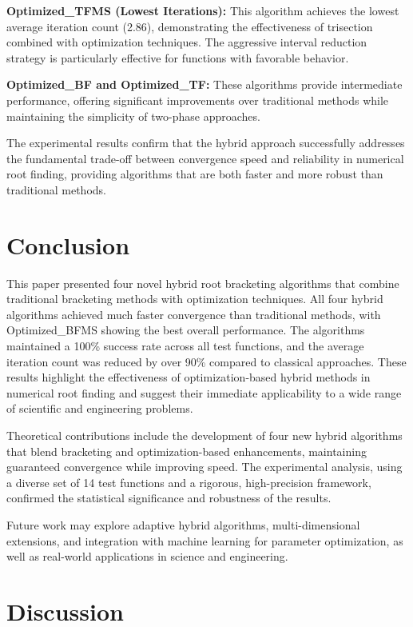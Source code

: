 \documentclass[amsmath, amssymb, aps]{revtex4-2}
\begin{document}
\textbf{Optimized\_TFMS (Lowest Iterations):} This algorithm achieves the lowest average iteration count (2.86), demonstrating the effectiveness of trisection combined with optimization techniques. The aggressive interval reduction strategy is particularly effective for functions with favorable behavior.

\textbf{Optimized\_BF and Optimized\_TF:} These algorithms provide intermediate performance, offering significant improvements over traditional methods while maintaining the simplicity of two-phase approaches.

The experimental results confirm that the hybrid approach successfully addresses the fundamental trade-off between convergence speed and reliability in numerical root finding, providing algorithms that are both faster and more robust than traditional methods.

\section{Conclusion}

This paper presented four novel hybrid root bracketing algorithms that combine traditional bracketing methods with optimization techniques. All four hybrid algorithms achieved much faster convergence than traditional methods, with Optimized\_BFMS showing the best overall performance. The algorithms maintained a 100\% success rate across all test functions, and the average iteration count was reduced by over 90\% compared to classical approaches. These results highlight the effectiveness of optimization-based hybrid methods in numerical root finding and suggest their immediate applicability to a wide range of scientific and engineering problems.

Theoretical contributions include the development of four new hybrid algorithms that blend bracketing and optimization-based enhancements, maintaining guaranteed convergence while improving speed. The experimental analysis, using a diverse set of 14 test functions and a rigorous, high-precision framework, confirmed the statistical significance and robustness of the results.

Future work may explore adaptive hybrid algorithms, multi-dimensional extensions, and integration with machine learning for parameter optimization, as well as real-world applications in science and engineering.

\section{Discussion}
\end{document}
